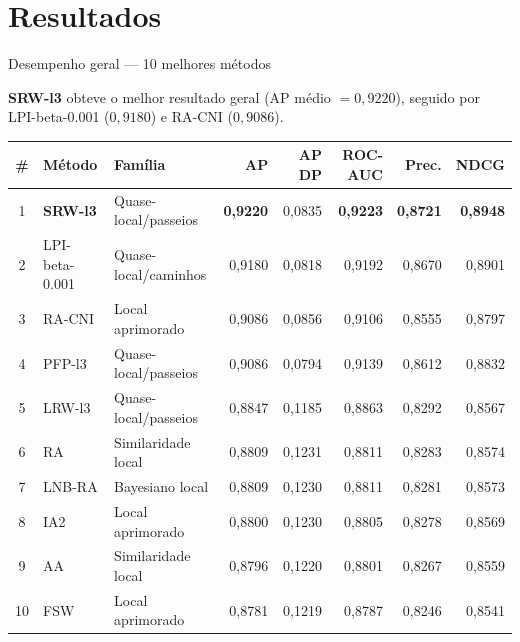 \documentclass[aspectratio=169,11pt]{beamer}
\providecommand{\EspacoAposTitulo}{\vspace*{0.93cm}}
\newcommand{\dest}[1]{\textcolor{modTeal}{\textbf{#1}}}
\begin{document}
\section{Resultados}

\begin{frame}[t]{Desempenho geral — 10 melhores métodos}

  \EspacoAposTitulo

  \dest{SRW-l3} obteve o melhor resultado geral (AP médio $=0{,}9220$),
  seguido por LPI-beta-0.001 ($0{,}9180$) e RA-CNI ($0{,}9086$).

  \vspace{0.14cm}
  {\footnotesize
  \setlength{\tabcolsep}{6pt}
  \renewcommand{\arraystretch}{1.0}
  \begin{center}
  \begin{tabular}{cllrrrrr}
    \toprule
    \textbf{\#} & \textbf{Método} & \textbf{Família} &
    \textbf{AP} & \textbf{AP DP} & \textbf{ROC-AUC} &
    \textbf{Prec.} & \textbf{NDCG} \\
    \midrule
    1  & \dest{SRW-l3} & Quase-local/passeios & \textbf{0,9220} & 0,0835 & \textbf{0,9223} & \textbf{0,8721} & \textbf{0,8948} \\
    2  & LPI-beta-0.001 & Quase-local/caminhos & 0,9180 & 0,0818 & 0,9192 & 0,8670 & 0,8901 \\
    3  & RA-CNI & Local aprimorado & 0,9086 & 0,0856 & 0,9106 & 0,8555 & 0,8797 \\
    4  & PFP-l3 & Quase-local/passeios & 0,9086 & 0,0794 & 0,9139 & 0,8612 & 0,8832 \\
    5  & LRW-l3 & Quase-local/passeios & 0,8847 & 0,1185 & 0,8863 & 0,8292 & 0,8567 \\
    6  & RA & Similaridade local & 0,8809 & 0,1231 & 0,8811 & 0,8283 & 0,8574 \\
    7  & LNB-RA & Bayesiano local & 0,8809 & 0,1230 & 0,8811 & 0,8281 & 0,8573 \\
    8  & IA2 & Local aprimorado & 0,8800 & 0,1230 & 0,8805 & 0,8278 & 0,8569 \\
    9  & AA & Similaridade local & 0,8796 & 0,1220 & 0,8801 & 0,8267 & 0,8559 \\
    10 & FSW & Local aprimorado & 0,8781 & 0,1219 & 0,8787 & 0,8246 & 0,8541 \\
    \bottomrule
  \end{tabular}
  \end{center}}

\end{frame}
\end{document}
